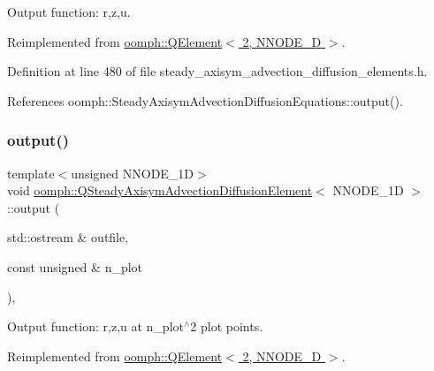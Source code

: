 Output function\+: r,z,u. 



Reimplemented from \hyperlink{classoomph_1_1QElement_3_012_00_01NNODE__1D_01_4_ab7bb815a43598e7ce0c4d10c511504fc}{oomph\+::\+Q\+Element$<$ 2, N\+N\+O\+D\+E\+\_\+D $>$}.



Definition at line 480 of file steady\+\_\+axisym\+\_\+advection\+\_\+diffusion\+\_\+elements.\+h.



References oomph\+::\+Steady\+Axisym\+Advection\+Diffusion\+Equations\+::output().

\mbox{\label{classoomph_1_1QSteadyAxisymAdvectionDiffusionElement_a5dd4db916c9c81fd0f72631a2a16c915}} 
\subsubsection{\texorpdfstring{output()}{output()}\hspace{0.1cm}{\footnotesize\ttfamily [2/4]}}
{\footnotesize\ttfamily template$<$unsigned N\+N\+O\+D\+E\+\_\+1D$>$ \\
void \hyperlink{classoomph_1_1QSteadyAxisymAdvectionDiffusionElement}{oomph\+::\+Q\+Steady\+Axisym\+Advection\+Diffusion\+Element}$<$ N\+N\+O\+D\+E\+\_\+1D $>$\+::output (\begin{DoxyParamCaption}\item[{std\+::ostream \&}]{outfile,  }\item[{const unsigned \&}]{n\+\_\+plot }\end{DoxyParamCaption})\hspace{0.3cm}{\ttfamily [inline]}, {\ttfamily [virtual]}}



Output function\+: r,z,u at n\+\_\+plot$^\wedge$2 plot points. 



Reimplemented from \hyperlink{classoomph_1_1QElement_3_012_00_01NNODE__1D_01_4_a865e3a77ee4cb67e7fcd7eca42d256f1}{oomph\+::\+Q\+Element$<$ 2, N\+N\+O\+D\+E\+\_\+D $>$}.



